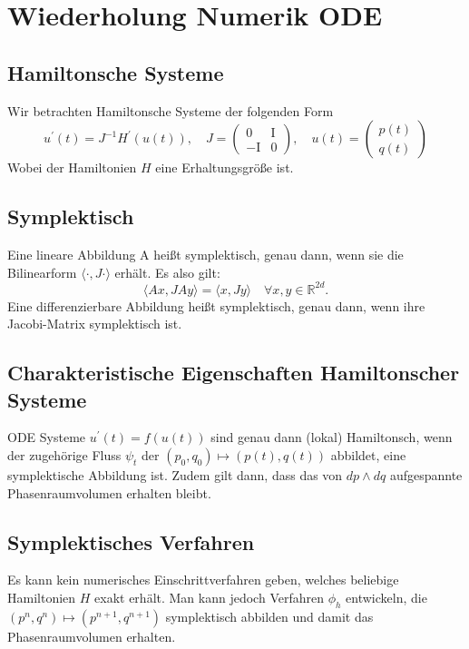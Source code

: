 \documentclass{handout}
\begin{document}
\maketitle

\section{Wiederholung Numerik ODE}
\subsection{Hamiltonsche Systeme}
Wir betrachten Hamiltonsche Systeme der folgenden Form
\begin{equation}
u^{\prime}(t)=J^{-1} H^{\prime}(u(t)),  \quad J=\left(\begin{array}{cc}
0 & \mathrm{I} \\
-\mathrm{I} & 0
\end{array}\right), \quad u(t) = \left(\begin{array}{c} p(t) \\ q(t) \end{array}\right)
\end{equation}
Wobei der Hamiltonien $H$ eine Erhaltungsgröße ist.

\subsection{Symplektisch}
Eine lineare Abbildung A heißt symplektisch, genau dann, wenn sie die Bilinearform $\langle \cdot,J\cdot\rangle$ erhält. Es also gilt:
\begin{equation}
    \langle Ax, J Ay\rangle = \langle x, J y\rangle \quad \forall x,y \in \mathbb{R}^{2d}.
\end{equation}
Eine differenzierbare Abbildung heißt symplektisch, genau dann, wenn ihre Jacobi-Matrix symplektisch ist. 

\subsection{Charakteristische Eigenschaften Hamiltonscher Systeme}

ODE Systeme $u^{\prime}(t)=f(u(t))$ sind genau dann (lokal) Hamiltonsch, wenn der zugehörige Fluss $\psi_t$ der $(p_0,q_0) \mapsto (p(t),q(t))$ abbildet, eine symplektische Abbildung ist. Zudem gilt dann, dass das von $dp\wedge dq$ aufgespannte Phasenraumvolumen erhalten bleibt.

\subsection{Symplektisches Verfahren}
Es kann kein numerisches Einschrittverfahren geben, welches beliebige Hamiltonien $H$ exakt erhält. Man kann jedoch Verfahren $\phi_h$ entwickeln, die $(p^n,q^n) \mapsto (p^{n+1},q^{n+1})$ symplektisch abbilden und damit das Phasenraumvolumen erhalten.
\end{document}
